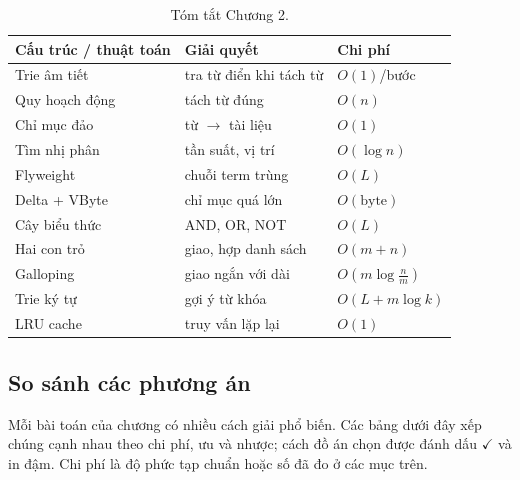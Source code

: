 \documentclass[9pt,twocolumn,a4paper]{extarticle}
\begin{document}
\begin{table}[H]
\centering
\caption{Tóm tắt Chương 2.}
\label{tab:c2}
\footnotesize
\begin{tabular}{@{}p{2.1cm}p{3.2cm}l@{}}
\toprule
Cấu trúc / thuật toán & Giải quyết & Chi phí \\
\midrule
Trie âm tiết & tra từ điển khi tách từ & $O(1)$/bước \\
Quy hoạch động & tách từ đúng & $O(n)$ \\
Chỉ mục đảo & từ $\to$ tài liệu & $O(1)$ \\
Tìm nhị phân & tần suất, vị trí & $O(\log n)$ \\
Flyweight & chuỗi term trùng & $O(L)$ \\
Delta + VByte & chỉ mục quá lớn & $O(\text{byte})$ \\
Cây biểu thức & AND, OR, NOT & $O(L)$ \\
Hai con trỏ & giao, hợp danh sách & $O(m+n)$ \\
Galloping & giao ngắn với dài & $O(m\log\frac{n}{m})$ \\
Trie ký tự & gợi ý từ khóa & $O(L+m\log k)$ \\
LRU cache & truy vấn lặp lại & $O(1)$ \\
\bottomrule
\end{tabular}
\end{table}
\subsection*{So sánh các phương án}
Mỗi bài toán của chương có nhiều cách giải phổ biến. Các bảng dưới đây xếp chúng cạnh nhau theo chi phí, ưu và nhược; cách đồ án chọn được đánh dấu $\checkmark$ và in đậm. Chi phí là độ phức tạp chuẩn hoặc số đã đo ở các mục trên.
\end{document}
